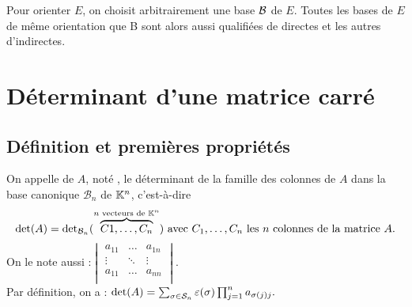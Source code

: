 \documentclass{book}
\begin{document}
\begin{Remarque}
Pour orienter $E$, on choisit arbitrairement une base  $\cal B$ de $E$. Toutes les bases de $E$ de même orientation que B sont alors aussi qualifiées de directes et les autres d'indirectes.
\end{Remarque}



\section{Déterminant d'une matrice carré}
\subsection{Définition et premières propriétés}

\begin{Definition}
On appelle  de $A$,  noté , le déterminant de la famille des colonnes de $A$ dans la base canonique $\mathcal{B}_n$ de $\K^n$, c'est-à-dire 
$$\det(A)=\det_{\mathcal{B}_n}(\overbrace{C1,\dots,C_n}^{n \text{ vecteurs de }\K^n})\text{ avec } C_1,\dots,C_n \text{ les }n\text{ colonnes de la matrice }A.$$
On le note aussi :$\begin{vmatrix}
a_{11}&\ldots&a_{1n}\\
\vdots&\ddots&\vdots\\
a_{11}&\ldots&a_{nn}\\
\end{vmatrix}.$\\
Par définition, on a :  $\det(A)=\sum_{\sigma\in{\cal S}_n} \varepsilon (\sigma ) \prod_{j=1}^n a_{\sigma(j)j}.$
\end{Definition}
\end{document}
